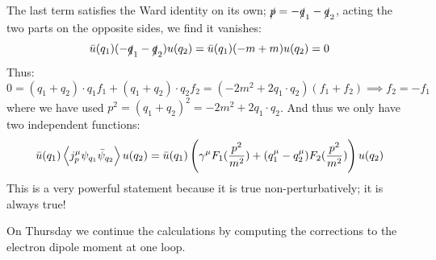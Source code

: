 The last term satisfies the Ward identity on its own; $\slashed{p} = -\slashed{q}_1 - \slashed{q}_2$, acting the two parts on the opposite sides, we find it vanishes:
\begin{equation}
    \bar{u}(q_1)(-\slashed{q}_1 - \slashed{q}_2)u(q_2) = \bar{u}(q_1)(-m + m)u(q_2) = 0
\end{equation}
Thus:
\begin{equation}
    0 = (q_1 + q_2)\cdot q_1f_1 + (q_1 + q_2)\cdot q_2 f_2 = (-2m^2+ 2q_1 \cdot q_2)(f_1 + f_2) \implies f_2 = -f_1
\end{equation}
where we have used $p^2 = (q_1 + q_2)^2 = -2m^2 + 2q_1 \cdot q_2$. And thus we only have two independent functions:
\begin{equation}
    \bar{u}(q_1)\left< j^\mu_p \psi_{q_1}\bar{\psi}_{q_2} \right>u(q_2) = \bar{u}(q_1)\left(\gamma^\mu F_1(\frac{p^2}{m^2}) + (q_1^\mu - q_2^\mu)F_2(\frac{p^2}{m^2})\right)u(q_2)
\end{equation}
This is a very powerful statement because it is true non-perturbatively; it is always true!

On Thursday we continue the calculations by computing the corrections to the electron dipole moment at one loop.